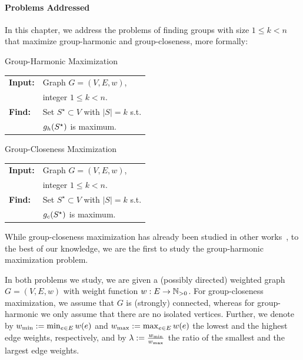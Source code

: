 \paragraph{Problems Addressed}
%
In this chapter, we address the problems of finding groups with size $1 \le k < n$
that maximize group-harmonic and group-closeness, more formally:

\begin{minipage}[t]{.45\textwidth}
\begin{cproblem}{Group-Harmonic Maximization}
\begin{tabular}{ll}
\textbf{Input:} & Graph $G = (V, E, w)$,\\
                & integer $1 \le k < n$.\\
\textbf{Find:} & Set $S^\star \subset V$ with $|S| = k$ s.t.\\
               & $g_h(S^\star)$ is maximum.
\end{tabular}
\end{cproblem}
\end{minipage}\hfill
\begin{minipage}[t]{.45\textwidth}
\begin{cproblem}{Group-Closeness Maximization}
\begin{tabular}{ll}
\textbf{Input:} & Graph $G = (V, E, w)$,\\
                & integer $1 \le k < n$.\\
\textbf{Find:} & Set $S^\star \subset V$ with $|S| = k$ s.t.\\
               & $g_c(S^\star)$ is maximum.
\end{tabular}
\end{cproblem}
\end{minipage}\vspace{\baselineskip}

While group-closeness maximization has already been studied in other
works~\cite{DBLP:conf/alenex/BergaminiGM18,DBLP:conf/bigdataconf/AngrimanGM19,DBLP:conf/adc/ChenWW16},
to the best of our knowledge, we are the first to study the group-harmonic
maximization problem.

In both problems we study, we are given a (possibly directed) weighted
graph $G = (V, E, w)$ with weight function $w : E \to \mathbb{N}_{> 0}$. For
group-closeness maximization, we assume that $G$ is (strongly) connected,
whereas for group-harmonic we only assume that there are no isolated vertices.
Further, we denote by
$w_{\min} := \min_{e \in E} w(e)$ and $w_{\max} := \max_{e \in E} w(e)$ the lowest
and the highest edge weights, respectively, and by $\lambda :=
\frac{w_{\min}}{w_{\max}}$ the ratio of the smallest and the
largest edge weights.


